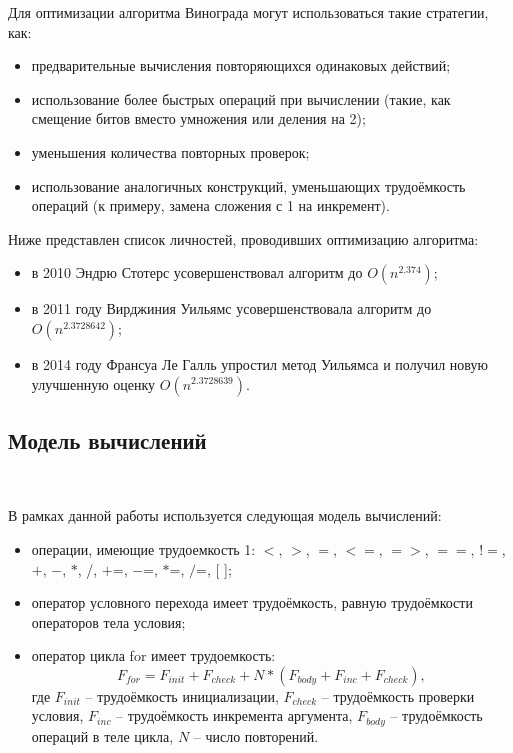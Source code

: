 \documentclass[12pt]{report}
\begin{document}
	Для оптимизации алгоритма Винограда могут использоваться такие стратегии, как:
	\begin{itemize}
		\item предварительные вычисления повторяющихся одинаковых действий;
		\item использование более быстрых операций при вычислении (такие, как смещение битов вместо умножения или деления на 2);
		\item уменьшения количества повторных проверок;
		\item использование аналогичных конструкций, уменьшающих трудоёмкость операций (к примеру, замена сложения с 1 на инкремент).
	\end{itemize}
	Ниже представлен список личностей, проводивших оптимизацию алгоритма:
	\begin{itemize}
		\item в 2010 Эндрю Стотерс усовершенствовал алгоритм до $O(n^{2.374})$;
		\item в 2011 году Вирджиния Уильямс усовершенствовала алгоритм до $O(n^{2.3728642})$;
		\item в 2014 году Франсуа Ле Галль упростил метод Уильямса и получил новую улучшенную оценку $O(n^{2.3728639})$.
	\end{itemize}
	
	\subsection{Модель вычислений}\label{model}
	
	~\
	
	В рамках данной работы используется следующая модель вычислений:
	\begin{itemize}
		\item операции, имеющие трудоемкость 1: $<$, $>$, $=$, $<=$, $=>$, $==$, $!=$,$+$, $-$, $\ast$, /, $+$=, $-$=, $\ast$=, $/$=, [ ];
		\item оператор условного перехода имеет трудоёмкость, равную трудоёмкости операторов тела условия;
		\item оператор цикла for имеет трудоемкость:
		\begin{equation}
		\label{for_cost}
		F_{for} = F_{init} + F_{check} + N \ast (F_{body} + F_{inc} + F_{check}),
		\end{equation}
		где $F_{init}$ -- трудоёмкость инициализации, $F_{check}$ -- трудоёмкость проверки условия, $F_{inc}$ -- трудоёмкость инкремента аргумента, $F_{body}$ -- трудоёмкость операций в теле цикла, $N$ -- число повторений. ~\cite{AlgAnalysis}
	\end{itemize} 
	
\end{document}
